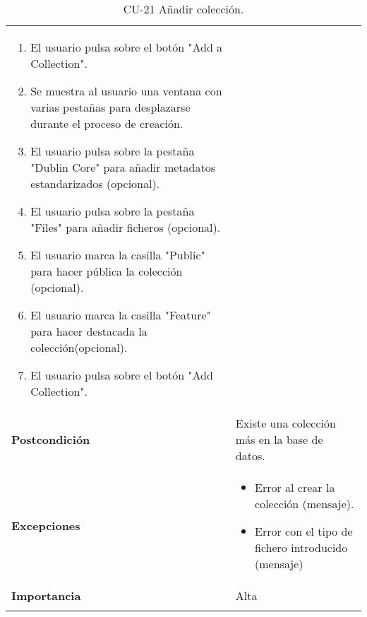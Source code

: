 \begin{longtable}[]{@{}ll@{}}
\begin{minipage}[t]{0.76\columnwidth}
\begin{enumerate}
\tightlist
\item
  El usuario pulsa sobre el botón "Add a Collection".
\item
  Se muestra al usuario una ventana con varias pestañas para desplazarse
  durante el proceso de creación.
\item
  El usuario pulsa sobre la pestaña "Dublin Core" para añadir metadatos
  estandarizados (opcional).
\item
  El usuario pulsa sobre la pestaña "Files" para añadir ficheros
  (opcional).
\item
  El usuario marca la casilla "Public" para hacer pública la colección
  (opcional).
\item
  El usuario marca la casilla "Feature" para hacer destacada la
  colección(opcional).
\item
  El usuario pulsa sobre el botón "Add Collection".
\end{enumerate}\strut
\end{minipage}\tabularnewline
\begin{minipage}[t]{0.18\columnwidth}\raggedright
\textbf{Postcondición}\strut
\end{minipage} & \begin{minipage}[t]{0.76\columnwidth}\raggedright
Existe una colección más en la base de datos.\strut
\end{minipage}\tabularnewline
\begin{minipage}[t]{0.18\columnwidth}\raggedright
\textbf{Excepciones}\strut
\end{minipage} & \begin{minipage}[t]{0.76\columnwidth}\raggedright
\begin{itemize}
\tightlist
\item
  Error al crear la colección (mensaje).
\item
  Error con el tipo de fichero introducido (mensaje)
\end{itemize}\strut
\end{minipage}\tabularnewline
\begin{minipage}[t]{0.18\columnwidth}\raggedright
\textbf{Importancia}\strut
\end{minipage} & \begin{minipage}[t]{0.76\columnwidth}\raggedright
Alta\strut
\end{minipage}\tabularnewline
\bottomrule
\caption{CU-21 Añadir colección.}
\end{longtable}

